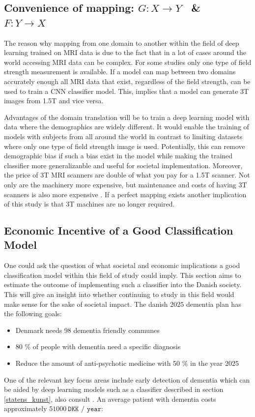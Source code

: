 \documentclass[12pt, fleqn, titlepage]{article}
\newcommand{\1}[1]{\mathds{1}\left[#1\right]}
\begin{document}
\subsection{Convenience of mapping: $ G: X \rightarrow Y $ \ \& \ $ F: Y \rightarrow X $ }

The reason why mapping from one domain to another within the field of deep learning trained on MRI data is due to the fact that in a lot of cases around the world accessing MRI data can be complex. For some studies only one type of field strength measurement is available. If a model can map between two domains accurately enough all MRI data that exist, regardless of the field strength, can be used to train a CNN classifier model. This, implies that a model can generate 3T images from 1.5T and vice versa. 

Advantages of the domain translation will be to train a deep learning model with data where the demographics are widely different. It would enable the training of models with subjects from all around the world in contrast to limiting datasets where only one type of field strength image is used. Potentially, this can remove demographic bias if such a bias exist in the model while making the trained classifier more generalizanble and useful for societal implementation.  Moreover, the price of 3T MRI scanners are double of what you pay for a 1.5T scanner. Not only are the machinery more expensive, but maintenance and costs of having 3T scanners is also more expensive \cite{kmg}. If a perfect mapping exists another implication of this study is that 3T machines are no longer required.

\subsection{Economic Incentive of a Good Classification Model}\label{discussion_economic}

One could ask the question of what societal and economic implications a good classification model within this field of study could imply. This section aims to estimate the outcome of implementing such a classifier into the Danish society. This will give an insight into whether continuing to study in this field would make sense for the sake of societal impact. The danish 2025 dementia plan has the following goals:

\begin{itemize}
	\item Denmark needs 98 dementia friendly communes
	\item 80 \% of people with dementia need a specific diagnosis 
	\item Reduce the amount of anti-psychotic medicine with 50 \% in the year 2025
\end{itemize}
\noindent
One of the relevant key focus areas include early detection of dementia which can be aided by deep learning models such as a classifier described in section \ref{statens_kunst}, also consult \cite{yudong, suk_and_shen_1, suk_and_shen_2, cheng, neuro}. An average patient with dementia costs approximately $ 51000 \ \texttt{DKK / year}$:
\end{document}
